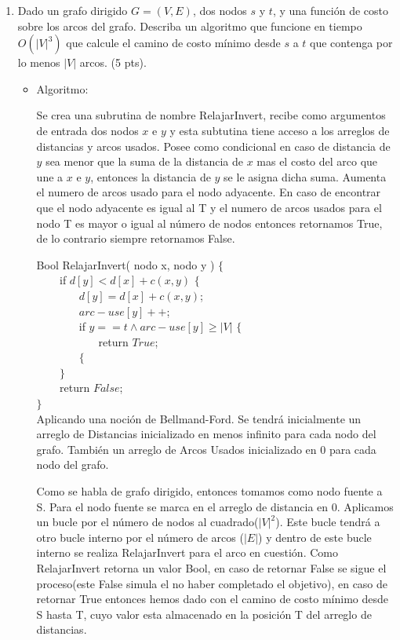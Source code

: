 \documentclass[a4paper,12pt]{article}
\begin{document}
\begin{enumerate}

\item Dado un grafo dirigido $G=(V,E)$, dos nodos $s$ y $t$,  y una función de costo sobre los arcos del grafo. Describa un algoritmo que funcione en tiempo $O(|V|^3)$ que calcule el camino de costo mínimo desde $s$ a $t$ que contenga por lo menos $|V|$ arcos. (5 pts).

\begin{itemize}

\item Algoritmo:

Se crea una subrutina de nombre RelajarInvert, recibe como argumentos de entrada dos nodos $x$ e $y$ y esta subtutina tiene acceso a los arreglos de distancias y arcos usados. Posee como condicional en caso de distancia de $y$ sea menor que la suma de la distancia de $x$ mas el costo del arco que une a $x$ e $y$, entonces la distancia de $y$ se le asigna dicha suma. Aumenta el numero de arcos usado para el nodo adyacente. En caso de encontrar que el nodo adyacente es igual al T y el numero de arcos usados para el nodo T es mayor o igual al número de nodos entonces retornamos True, de lo contrario siempre retornamos False.

Bool RelajarInvert( nodo x, nodo y ) $\{$ \\
$~~~~~~~~$ if $d[y] < d[x]+c(x,y)$ $\{$ \\
$~~~~~~~~~~~~~~~~$ $d[y] = d[x]+c(x,y)$; \\
$~~~~~~~~~~~~~~~~$ $arc-use[y]++$; \\
$~~~~~~~~~~~~~~~~$ if $ y == t \land arc-use[y] \geq |V|$ 	$\{$ \\	
$~~~~~~~~~~~~~~~~~~~~~~~~$ return $True$;\\
$~~~~~~~~~~~~~~~~$ $\{$ \\
$~~~~~~~~$ $\}$ \\
$~~~~~~~~$ return $False$; \\	
$\}$ \\

Aplicando una noción de Bellmand-Ford. Se tendrá inicialmente un arreglo de Distancias inicializado en menos infinito para cada nodo del grafo. También un arreglo de Arcos Usados inicializado en 0 para cada nodo del grafo.

Como se habla de grafo dirigido, entonces tomamos como nodo fuente a S.
Para el nodo fuente se marca en el arreglo de distancia en 0. Aplicamos un bucle por el número de nodos al cuadrado($|V|^2$). Este bucle tendrá a otro bucle interno por el número de arcos ($|E|$) y dentro de este bucle interno se realiza RelajarInvert para el arco en cuestión. Como RelajarInvert retorna un valor Bool, en caso de retornar False se sigue el proceso(este False simula el no haber completado el objetivo), en caso de retornar True entonces hemos dado con el camino de costo mínimo desde S hasta T, cuyo valor esta almacenado en la posición T del arreglo de distancias. 


\end{itemize}
\end{enumerate}
\end{document}
